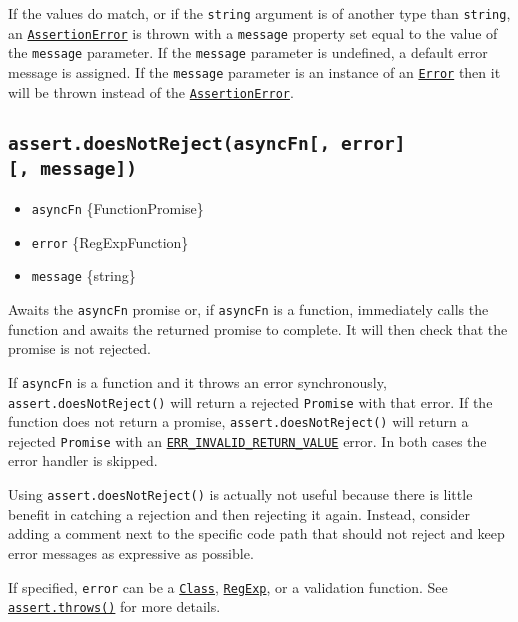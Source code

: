 If the values do match, or if the \texttt{string} argument is of another
type than \texttt{string}, an
\hyperref[class-assertassertionerror]{\texttt{AssertionError}} is thrown
with a \texttt{message} property set equal to the value of the
\texttt{message} parameter. If the \texttt{message} parameter is
undefined, a default error message is assigned. If the \texttt{message}
parameter is an instance of an
\href{errors.md\#class-error}{\texttt{Error}} then it will be thrown
instead of the
\hyperref[class-assertassertionerror]{\texttt{AssertionError}}.

\subsection{\texorpdfstring{\texttt{assert.doesNotReject(asyncFn{[},\ error{]}{[},\ message{]})}}{assert.doesNotReject(asyncFn{[}, error{]}{[}, message{]})}}\label{assert.doesnotrejectasyncfn-error-message}

\begin{itemize}
\tightlist
\item
  \texttt{asyncFn} \{Function\textbar Promise\}
\item
  \texttt{error} \{RegExp\textbar Function\}
\item
  \texttt{message} \{string\}
\end{itemize}

Awaits the \texttt{asyncFn} promise or, if \texttt{asyncFn} is a
function, immediately calls the function and awaits the returned promise
to complete. It will then check that the promise is not rejected.

If \texttt{asyncFn} is a function and it throws an error synchronously,
\texttt{assert.doesNotReject()} will return a rejected \texttt{Promise}
with that error. If the function does not return a promise,
\texttt{assert.doesNotReject()} will return a rejected \texttt{Promise}
with an
\href{errors.md\#err_invalid_return_value}{\texttt{ERR\_INVALID\_RETURN\_VALUE}}
error. In both cases the error handler is skipped.

Using \texttt{assert.doesNotReject()} is actually not useful because
there is little benefit in catching a rejection and then rejecting it
again. Instead, consider adding a comment next to the specific code path
that should not reject and keep error messages as expressive as
possible.

If specified, \texttt{error} can be a
\href{https://developer.mozilla.org/en-US/docs/Web/JavaScript/Reference/Classes}{\texttt{Class}},
\href{https://developer.mozilla.org/en-US/docs/Web/JavaScript/Guide/Regular_Expressions}{\texttt{RegExp}},
or a validation function. See
\hyperref[assertthrowsfn-error-message]{\texttt{assert.throws()}} for
more details.


